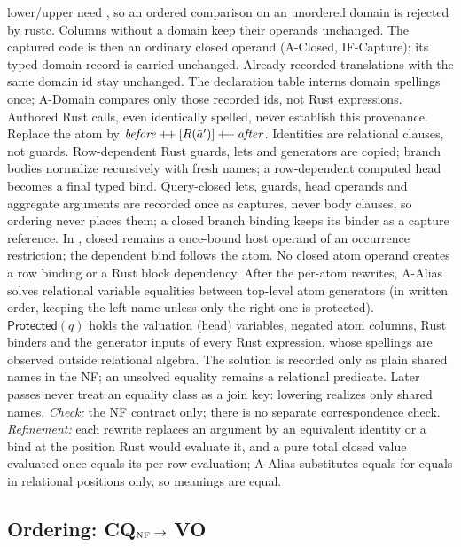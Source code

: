 \textsf{lower}/\textsf{upper} need , so an ordered
comparison on an unordered domain is rejected by rustc. Columns without a
domain keep their operands unchanged. The captured code is then an ordinary
closed operand (A-Closed, IF-Capture); its typed domain record is carried unchanged.
Already recorded translations with the same domain id stay unchanged.
The declaration table interns domain spellings once; A-Domain compares only
those recorded ids, not Rust expressions.
Authored Rust calls, even identically spelled, never establish this provenance.
Replace the atom by $\mathit{before}\mathbin{+\!+}[R(\bar a')]\mathbin{+\!+}\mathit{after}$.
Identities are relational clauses, not guards. Row-dependent Rust guards,
lets and generators are copied; branch bodies normalize recursively with fresh names; a
row-dependent computed head becomes a final typed bind. Query-closed lets, guards,
head operands and aggregate arguments are recorded once as captures, never body
clauses, so ordering never places them; a closed branch binding keeps its binder
as a capture reference. In , closed
 remains a once-bound host operand of an occurrence restriction;
the dependent  bind follows the atom. No closed atom operand creates
a row binding or a Rust block dependency.
After the per-atom rewrites, A-Alias solves relational variable equalities
between top-level atom generators (in written order, keeping the left name
unless only the right one is protected). $\mathsf{Protected}(q)$ holds the
valuation (head) variables, negated atom columns, Rust binders and the
generator inputs of every Rust expression, whose spellings are observed outside
relational algebra. The solution is recorded only as plain shared names in the
NF; an unsolved equality remains a relational predicate. Later passes never
treat an equality class as a join key: lowering realizes only shared names.
\emph{Check:} the NF contract only; there is no separate correspondence check.
\emph{Refinement:} each rewrite replaces an argument by an equivalent
identity or a bind at the position Rust would evaluate it, and a pure total
closed value evaluated once equals its per-row evaluation; A-Alias substitutes
equals for equals in relational positions only, so meanings are equal.

\subsection{Ordering: CQ$_{\rm NF}\to$ VO}
\label{sec:planning-order}

